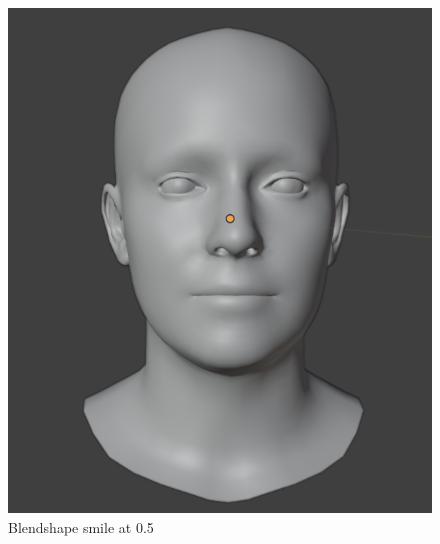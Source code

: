 \documentclass[../../main.tex]{subfiles}
\begin{document}
\begin{subfigure}{0.33\linewidth}
  \includegraphics[width=\linewidth]{chapters/background_work/images/blendshapes_example/blendshapes_example_1.png}
  \caption{Blendshape smile at 0.5}
\end{subfigure}
\hfill
\end{document}
